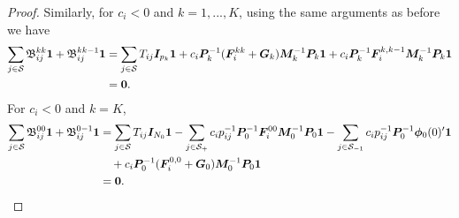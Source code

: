 \begin{proof}
		Similarly, for \(c_i<0\) and \(k=1,...,K\), using the same arguments as before we have
	\begin{align*}
		\sum_{j\in\mathcal{S}}\mathfrak{\boldsymbol B}^{kk}_{ij}\boldsymbol 1 + \mathfrak{\boldsymbol B}^{kk-1}_{ij}\boldsymbol 1
		&=\sum_{j\in\mathcal{S}}T_{ij}\boldsymbol I_{p_k}\boldsymbol 1 + c_i \boldsymbol P_k^{-1}(\boldsymbol F_i^{kk}+\boldsymbol G_k)\boldsymbol M_k^{-1}\boldsymbol P_k\boldsymbol 1 + c_i \boldsymbol P_k^{-1}\boldsymbol F_i^{k,k-1}\boldsymbol M_k^{-1}\boldsymbol P_k\boldsymbol 1
		\\&= \boldsymbol 0.
	\end{align*}
	For \(c_i<0\) and \(k=K\), 
	\begin{align*}
		\sum_{j\in\mathcal{S}}\mathfrak{\boldsymbol B}^{00}_{ij}\boldsymbol 1 + \mathfrak{\boldsymbol B}^{0{-1}}_{ij}\boldsymbol 1
		&= \sum_{j\in\mathcal{S}}T_{ij}\boldsymbol I_{N_0}\boldsymbol 1-\sum_{j\in\mathcal{S}_+} c_ip_{ij}^{-1} \boldsymbol P_0^{-1}\boldsymbol F_i^{00}\boldsymbol M_0^{-1}\boldsymbol P_0 \boldsymbol 1 -\sum_{j\in\mathcal{S}_{{-1} }}c_ip_{ij}^{-1} \boldsymbol P_0^{-1}\boldsymbol \phi_0(0)'{}\boldsymbol 1 
		\\&\quad{} + c_i \boldsymbol P_0^{-1}(\boldsymbol F_i^{0,0}+\boldsymbol G_0)\boldsymbol M_0^{-1}\boldsymbol P_0\boldsymbol 1 
		\\&= \boldsymbol 0.
	\end{align*}


\end{proof}
